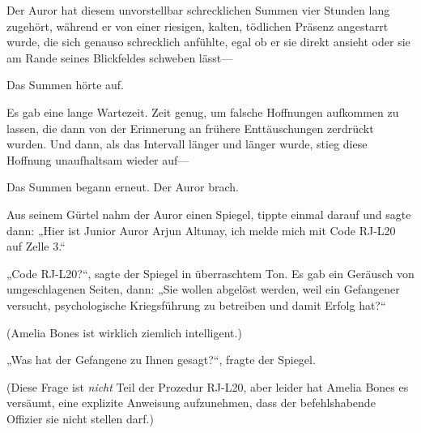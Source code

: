 Der Auror hat diesem unvorstellbar schrecklichen Summen vier Stunden lang zugehört, während er von einer riesigen, kalten, tödlichen Präsenz angestarrt wurde, die sich genauso schrecklich anfühlte, egal ob er sie direkt ansieht oder sie am Rande seines Blickfeldes schweben lässt—

Das Summen hörte auf.

 Es gab eine lange Wartezeit. Zeit genug, um falsche Hoffnungen aufkommen zu lassen, die dann von der Erinnerung an frühere Enttäuschungen zerdrückt wurden. Und dann, als das Intervall länger und länger wurde, stieg diese Hoffnung unaufhaltsam wieder auf—

Das Summen begann erneut. Der Auror brach.

Aus seinem Gürtel nahm der Auror einen Spiegel, tippte einmal darauf und sagte dann: „Hier ist Junior Auror Arjun Altunay, ich melde mich mit Code RJ-L20 auf Zelle 3.“

„Code RJ-L20?“, sagte der Spiegel in überraschtem Ton. Es gab ein Geräusch von umgeschlagenen Seiten, dann: „Sie wollen abgelöst werden, weil ein Gefangener versucht, psychologische Kriegsführung zu betreiben und damit Erfolg hat?“

(Amelia Bones ist wirklich ziemlich intelligent.)

„Was hat der Gefangene zu Ihnen gesagt?“, fragte der Spiegel.

(Diese Frage ist \emph{nicht} Teil der Prozedur RJ-L20, aber leider hat Amelia Bones es versäumt, eine explizite Anweisung aufzunehmen, dass der befehlshabende Offizier sie nicht stellen darf.)


